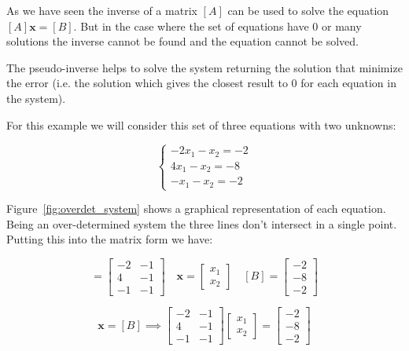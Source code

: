 As we have seen the inverse of a matrix $[A]$ can be used to solve the equation $[A]\boldsymbol{x}=[B]$. But in the case where the set of equations have 0 or many solutions the inverse cannot be found and the equation cannot be solved. 

The pseudo-inverse helps to solve the system returning the solution that minimize the error (i.e. the solution which gives the closest result to 0 for each equation in the system). 

For this example we will consider this set of three equations with two unknowns:

\begin{equation*}
\begin{cases}
-2x_1-x_2=-2 \\
4x_1-x_2=-8 \\
-x_1-x_2=-2 
\end{cases}
\end{equation*}

Figure~\ref{fig:overdet_system} shows a graphical representation of each equation. Being an over-determined system the three lines don't intersect in a single point. Putting this into the matrix form we have:

\begin{equation*}
[A]=\begin{bmatrix}
-2&-1\\
4&-1\\
-1&-1\end{bmatrix}\quad 
\boldsymbol{x}=\begin{bmatrix}
x_1\\
x_2\end{bmatrix}\quad
[B]=\begin{bmatrix}
-2\\
-8\\
-2\end{bmatrix}
\end{equation*}

\begin{equation*}
[A]\boldsymbol{x}=[B]\implies 
\begin{bmatrix}
-2&-1\\
4&-1\\
-1&-1\end{bmatrix}
\begin{bmatrix}
x_1\\
x_2\end{bmatrix}=
\begin{bmatrix}
-2\\
-8\\
-2\end{bmatrix}
\end{equation*}

